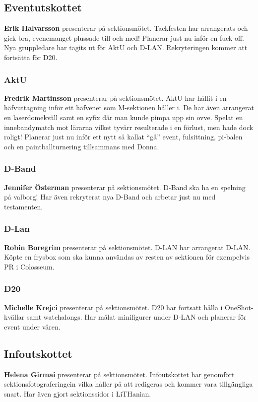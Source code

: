 \documentclass[../protokoll_varmote_2022.tex]{subfiles}
\begin{document}
\subsection{Eventutskottet}
\textbf{Erik Halvarsson} presenterar på sektionsmötet.
Tackfesten har arrangerats och gick bra, evenemanget plussade till och med! Planerar just nu inför en fuck-off. Nya gruppledare har tagits ut för AktU och D-LAN. Rekryteringen kommer att fortsätta för D20.

\subsubsection{AktU}
\textbf{Fredrik Martinsson} presenterar på sektionsmötet.
AktU har hållit i en häfvuttagning inför ett häfvenet som M-sektionen håller i. De har även arrangerat en laserdomekväll samt en syfix där man kunde pimpa upp sin ovve. Spelat en innebandymatch mot lärarna vilket tyvärr resulterade i en förlust, men hade dock roligt! Planerar just nu inför ett nytt så kallat ``gå'' event, fulsittning, pi-balen och en paintballturnering tillsammans med Donna.

\subsubsection{D-Band}
\textbf{Jennifer Österman} presenterar på sektionsmötet.
D-Band ska ha en spelning på valborg! Har även rekryterat nya D-Band och arbetar just nu med testamenten.


\subsubsection{D-Lan}
\textbf{Robin Boregrim} presenterar på sektionsmötet.
D-LAN har arrangerat D-LAN. Köpte en frysbox som ska kunna användas av resten av sektionen för exempelvis PR i Colosseum.

\subsubsection{D20}
\textbf{Michelle Krejci} presenterar på sektionsmötet.
D20 har fortsatt hålla i OneShot-kvällar samt watchalongs. Har målat minifigurer under D-LAN och planerar för event under våren.

\subsection{Infoutskottet}
\textbf{Helena Girmai} presenterar på sektionsmötet.
Infoutskottet har genomfört sektionsfotograferingein vilka håller på att redigeras och kommer vara tillgängliga snart. Har även gjort sektionssidor i LiTHanian.
\end{document}
